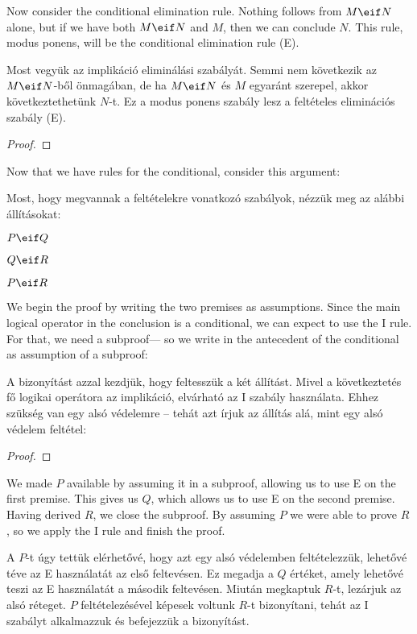 Now consider the conditional elimination rule. Nothing follows from $M\eif N$ alone, but if we have both $M \eif N$ and $M$, then we can conclude $N$. This rule, modus ponens, will be the conditional elimination rule ({\eif}E).

Most vegyük az implikáció eliminálási szabályát. Semmi nem következik az $M\eif N$-ből önmagában, de ha $M \eif N$ és $M$ egyaránt szerepel, akkor következtethetünk $N$-t. Ez a modus ponens szabály lesz a feltételes eliminációs szabály ({\eif}E).

\begin{proof}
	 
\end{proof}

Now that we have rules for the conditional, consider this argument:

Most, hogy megvannak a feltételekre vonatkozó szabályok, nézzük meg az alábbi állításokat:

\label{proofHS}
\begin{earg}
\item[] $P \eif Q$
\item[] $Q \eif R$
\item[\therefore] $P \eif R$
\end{earg}
We begin the proof by writing the two premises as assumptions. Since the main logical operator in the conclusion is a conditional, we can expect to use the {\eif}I rule. For that, we need a subproof--- so we write in the antecedent of the conditional as assumption of a subproof:

A bizonyítást azzal kezdjük, hogy feltesszük a két állítást. Mivel a következtetés fő logikai operátora az implikáció, elvárható az {\eif}I szabály használata. Ehhez szükség van egy alsó védelemre -- tehát azt írjuk az állítás alá, mint egy alsó védelem feltétel:

\begin{proof}
	\open
	\close
\end{proof}

We made $P$ available by assuming it in a subproof, allowing us to use {\eif}E on the first premise. This gives us $Q$, which allows us to use {\eif}E on the second premise. Having derived  $R$, we close the subproof. By assuming $P$ we were able to prove $R$, so we apply the {\eif}I rule and finish the proof.

A $P$-t úgy tettük elérhetővé, hogy azt egy alsó védelemben feltételezzük, lehetővé téve az {\eif}E használatát az első feltevésen. Ez megadja a $Q$ értéket, amely lehetővé teszi az {\eif}E használatát a második feltevésen. Miután megkaptuk $R$-t, lezárjuk az alsó réteget. $P$ feltételezésével képesek voltunk $R$-t bizonyítani, tehát az {\eif}I szabályt alkalmazzuk és befejezzük a bizonyítást.

